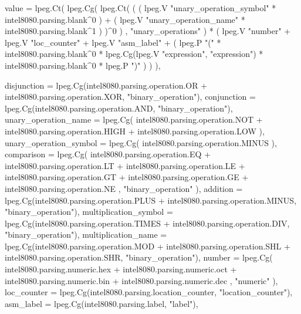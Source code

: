 {        value = lpeg.Ct(
            lpeg.Cg(
                lpeg.Ct(
                    (
                        (
                            lpeg.V "unary_operation_symbol"
                            * intel8080.parsing.blank^0
                        )
                        +
                        (
                            lpeg.V "unary_operation_name"
                            * intel8080.parsing.blank^1
                        )
                    )^0
                )
                , "unary_operations"
            )
            * (
                lpeg.V "number"
                + lpeg.V "loc_counter"
                + lpeg.V "asm_label"
                + (
                    lpeg.P "("
                    * intel8080.parsing.blank^0
                    * lpeg.Cg(lpeg.V "expression", "expression")
                    * intel8080.parsing.blank^0
                    * lpeg.P ")"
                )
            )
        ),

        disjunction = lpeg.Cg(intel8080.parsing.operation.OR + intel8080.parsing.operation.XOR, "binary_operation"),
        conjunction = lpeg.Cg(intel8080.parsing.operation.AND, "binary_operation"),
        unary_operation_name = lpeg.Cg(
            intel8080.parsing.operation.NOT
            + intel8080.parsing.operation.HIGH
            + intel8080.parsing.operation.LOW
        ),
        unary_operation_symbol = lpeg.Cg(
            intel8080.parsing.operation.MINUS
        ),
        comparison = lpeg.Cg(
            intel8080.parsing.operation.EQ
            + intel8080.parsing.operation.LT
            + intel8080.parsing.operation.LE
            + intel8080.parsing.operation.GT
            + intel8080.parsing.operation.GE
            + intel8080.parsing.operation.NE
            , "binary_operation"
        ),
        addition = lpeg.Cg(intel8080.parsing.operation.PLUS + intel8080.parsing.operation.MINUS, "binary_operation"),
        multiplication_symbol = lpeg.Cg(intel8080.parsing.operation.TIMES + intel8080.parsing.operation.DIV, "binary_operation"),
        multiplication_name = lpeg.Cg(intel8080.parsing.operation.MOD + intel8080.parsing.operation.SHL + intel8080.parsing.operation.SHR, "binary_operation"),
        number = lpeg.Cg(
            intel8080.parsing.numeric.hex
            + intel8080.parsing.numeric.oct
            + intel8080.parsing.numeric.bin
            + intel8080.parsing.numeric.dec
            , "numeric"
        ),
        loc_counter = lpeg.Cg(intel8080.parsing.location_counter, "location_counter"),
        asm_label = lpeg.Cg(intel8080.parsing.label, "label"),
    }

